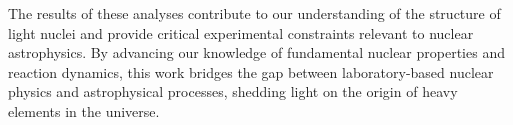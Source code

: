 The results of these analyses contribute to our understanding of the structure of light nuclei and provide critical experimental constraints relevant to nuclear astrophysics. By advancing our knowledge of fundamental nuclear properties and reaction dynamics, this work bridges the gap between laboratory-based nuclear physics and astrophysical processes, shedding light on the origin of heavy elements in the universe.
